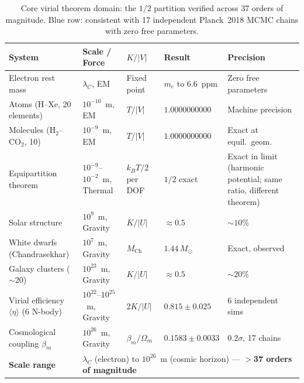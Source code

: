\documentclass[12pt,a4paper]{article}
\begin{document}
\begin{table}[H]
\centering
\small
\caption{Core virial theorem domain: the $1/2$ partition verified across
37 orders of magnitude. \colorbox{mcmcrow}{Blue row}: consistent with 17
independent Planck~2018 MCMC chains with zero free parameters.}
\label{tab:core}
\begin{tabular}{p{3.5cm} p{3.0cm} p{1.8cm} p{3.5cm} p{2.8cm}}
\toprule
\textbf{System} & \textbf{Scale / Force} & \textbf{$K/|V|$} &
\textbf{Result} & \textbf{Precision} \\
\midrule
Electron rest mass
& $\lambda_C$, EM
& Fixed point
& $m_e$ to 6.6~ppm
& Zero free parameters \citep{IAM_electron} \\[3pt]
Atoms (H--Xe, 20 elements)
& $10^{-10}$~m, EM
& $T/|V|$
& $1.0000000000$
& Machine precision \citep{Clementi1974,Bunge1993} \\[3pt]
Molecules (H$_2$--CO$_2$, 10)
& $10^{-9}$~m, EM
& $T/|V|$
& $1.0000000000$
& Exact at equil.\ geom.\ \citep{Clementi1974,Bunge1993} \\[3pt]
Equipartition theorem
& $10^{-9}$--$10^{-2}$~m, Thermal
& $k_BT/2$ per DOF
& $1/2$ exact
& Exact in limit (harmonic potential; same ratio, different theorem) \\[3pt]
Solar structure
& $10^{9}$~m, Gravity
& $K/|U|$
& $\approx 0.5$
& $\sim 10\%$ \citep{IAM_virial} \\[3pt]
White dwarfs (Chandrasekhar)
& $10^{7}$~m, Gravity
& $M_\mathrm{Ch}$
& $1.44\,M_\odot$
& Exact, observed \citep{Chandrasekhar1931} \\[3pt]
Galaxy clusters ($\sim$20)
& $10^{23}$~m, Gravity
& $K/|U|$
& $\approx 0.5$
& $\sim 20\%$ \citep{IAM_virial} \\[3pt]
Virial efficiency $\langle\eta\rangle$ (6 N-body)
& $10^{22}$--$10^{25}$~m, Gravity
& $2K/|U|$
& $0.815 \pm 0.025$
& 6 independent sims \citep{BryanNorman1998,Bett2007,Neto2007,Ludlow2010,Power2012,Klypin2016} \\[3pt]
\rowcolor{mcmcrow}
Cosmological coupling $\beta_m$
& $10^{26}$~m, Gravity
& $\beta_m/\Omega_m$
& $0.1583 \pm 0.0033$
& $0.2\sigma$, 17 chains \citep{IAM_obs} \\
\midrule
\textbf{Scale range}
& \multicolumn{4}{l}{$\lambda_C$ (electron) to $10^{26}$~m (cosmic horizon) ---
\textbf{$>$37 orders of magnitude}} \\
\bottomrule
\end{tabular}
\end{table}
\end{document}
